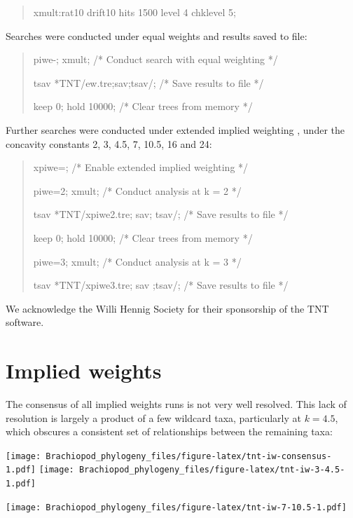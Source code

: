 \documentclass[]{book}
\theoremstyle{definition}
\theoremstyle{definition}
\theoremstyle{definition}
\theoremstyle{remark}
\begin{document}
\begin{quote}
xmult:rat10 drift10 hits 1500 level 4 chklevel 5;
\end{quote}

Searches were conducted under equal weights and results saved to file:

\begin{quote}
piwe-; xmult; {/* Conduct search with equal weighting */}

tsav *TNT/ew.tre;sav;tsav/; {/* Save results to file */}

keep 0; hold 10000; {/* Clear trees from memory */}
\end{quote}

Further searches were conducted under extended implied weighting
\citep{Goloboff1997, Goloboff2014}, under the concavity constants 2, 3,
4.5, 7, 10.5, 16 and 24:

\begin{quote}
xpiwe=; {/* Enable extended implied weighting */}

piwe=2; xmult; {/* Conduct analysis at k = 2 */}

tsav *TNT/xpiwe2.tre; sav; tsav/; {/* Save results to file */}

keep 0; hold 10000; {/* Clear trees from memory */}

piwe=3; xmult; {/* Conduct analysis at k = 3 */}

tsav *TNT/xpiwe3.tre; sav ;tsav/; {/* Save results to file */}
\end{quote}

We acknowledge the Willi Hennig Society for their sponsorship of the TNT
software.

\hypertarget{implied-weights}{%
\section{Implied weights}\label{implied-weights}}

The consensus of all implied weights runs is not very well resolved.
This lack of resolution is largely a product of a few wildcard taxa,
particularly at \(k = 4.5\), which obscures a consistent set of
relationships between the remaining taxa:

\texttt{[image: Brachiopod\_phylogeny\_files/figure-latex/tnt-iw-consensus-1.pdf]}
\texttt{[image: Brachiopod\_phylogeny\_files/figure-latex/tnt-iw-3-4.5-1.pdf]}

\texttt{[image: Brachiopod\_phylogeny\_files/figure-latex/tnt-iw-7-10.5-1.pdf]}
\end{document}
